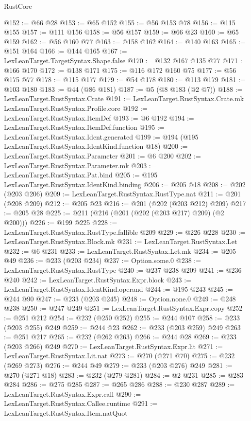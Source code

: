 \begin{lexlean}{RustCore}
\begin{coremodule}
@152 := @66 @28
@153 := @65 @152
@155 := @56 @153 @78
@156 := @115 @155
@157 := @111 @156
@158 := @56 @157
@159 := @66 @23
@160 := @65 @159
@162 := @56 @160 @77
@163 := @158 @162
@164 := @140 @163
@165 := @151 @164
@166 := @144 @165
@167 := LexLeanTarget.TargetSyntax.Shape.false
@170 := @132 @167 @135 @77
@171 := @166 @170
@172 := @138 @171
@175 := @116 @172 @160 @75
@177 := @56 @175 @77
@178 := @115 @177
@179 := @54 @178
@180 := @113 @179
@181 := @103 @180
@183 := @44 (@86 @181)
@187 := @5 (@8 @183 (@2 @7))
@188 := LexLeanTarget.RustSyntax.Crate
@191 := LexLeanTarget.RustSyntax.Crate.mk LexLeanTarget.RustSyntax.Profile.core
@192 := LexLeanTarget.RustSyntax.ItemDef
@193 := @6 @192
@194 := LexLeanTarget.RustSyntax.ItemDef.function
@195 := LexLeanTarget.RustSyntax.Ident.generated
@199 := @194 (@195 LexLeanTarget.RustSyntax.IdentKind.function @18)
@200 := LexLeanTarget.RustSyntax.Parameter
@201 := @6 @200
@202 := LexLeanTarget.RustSyntax.Parameter.mk
@203 := LexLeanTarget.RustSyntax.Pat.bind
@205 := @195 LexLeanTarget.RustSyntax.IdentKind.binding
@206 := @205 @18
@208 := @202 (@203 @206)
@209 := LexLeanTarget.RustSyntax.RustType.nat
@211 := @201 (@208 @209)
@212 := @205 @23
@216 := @201 (@202 (@203 @212) @209)
@217 := @205 @28
@225 := @211 (@216 (@201 (@202 (@203 @217) @209) (@2 @200)))
@226 := @199 @225
@228 := LexLeanTarget.RustSyntax.RustType.fallible @209
@229 := @226 @228
@230 := LexLeanTarget.RustSyntax.Block.mk
@231 := LexLeanTarget.RustSyntax.Let
@232 := @6 @231
@233 := LexLeanTarget.RustSyntax.Let.mk
@234 := @205 @49
@236 := @233 (@203 @234)
@237 := Option.some.{0}
@238 := LexLeanTarget.RustSyntax.RustType
@240 := @237 @238 @209
@241 := @236 @240
@242 := LexLeanTarget.RustSyntax.Expr.block
@243 := LexLeanTarget.RustSyntax.IdentKind.operand
@244 := @195 @243
@245 := @244 @90
@247 := @233 (@203 @245)
@248 := Option.none.{0}
@249 := @248 @238
@250 := @247 @249
@251 := LexLeanTarget.RustSyntax.Expr.copy
@252 := @251 @212
@254 := @232 (@250 @252)
@255 := @244 @107
@258 := @233 (@203 @255) @249
@259 := @244 @23
@262 := @233 (@203 @259) @249
@263 := @251 @217
@265 := @232 (@262 @263)
@266 := @244 @28
@269 := @233 (@203 @266) @249
@270 := LexLeanTarget.RustSyntax.Expr.lit
@271 := LexLeanTarget.RustSyntax.Lit.nat
@273 := @270 (@271 @70)
@275 := @232 (@269 @273)
@276 := @244 @49
@279 := @233 (@203 @276) @249
@281 := @270 (@271 @18)
@283 := @232 (@279 @281)
@284 := @2 @231
@285 := @283 @284
@286 := @275 @285
@287 := @265 @286
@288 := @230 @287
@289 := LexLeanTarget.RustSyntax.Expr.call
@290 := LexLeanTarget.RustSyntax.Callee.runtime
@291 := LexLeanTarget.RustSyntax.Item.natQuot

\end{coremodule}
\end{lexlean}

